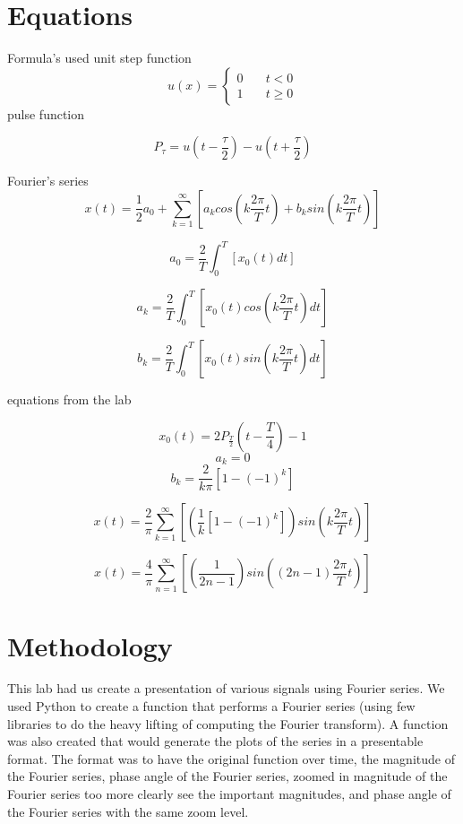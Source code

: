 \documentclass[12pt,a4paper]{article}
\begin{document}
\section{Equations}\label{sec:lit-rev}
Formula's used
unit step function
\[
u(x) = \left\{
        \begin{array}{ll}
            0 & \quad t < 0 \\
            1 & \quad t \geq 0
        \end{array}
    \right.
\]
pulse function

\[P_{\tau} = u \left (t-\frac \tau 2 \right)-u \left (t+\frac \tau 2 \right)\]

Fourier's series
\[x(t) = \frac 1  2 a_0 + \sum_{k=1}^\infty \left[ a_k cos \left (k \frac {2\pi}  T t \right) + b_k sin \left(k \frac {2\pi}  T t \right) \right]\]

\[a_0 = \frac 2 T \int_0^T \left [ x_0(t) dt \right ]\]

\[a_k = \frac 2 T \int_0^T \left [ x_0(t) cos \left (k \frac {2 \pi} T t \right )dt \right ]\]

\[b_k = \frac 2 T \int_0^T \left [ x_0(t) sin \left (k \frac {2 \pi} T t \right )dt \right ]\]


equations from the lab

\[x_0(t) = 2 P_{\frac T 2} \left (t-\frac T 4 \right)- 1\]
\[a_k =  0\]
\[b_k =   \frac 2  {k \pi}   \left [ 1-(-1)^k \right ] \]


\[x(t) = \frac 2  { \pi }  \sum _{k=1}^\infty \left[ \left (\frac 1  {k}   \left [1- (-1)^k \right ] \right) sin \left(k \frac {2 \pi}  {T} t \right) \right]\]

\[x(t) = \frac 4  { \pi }  \sum_{n=1}^\infty \left[ \left(\frac 1  {2n-1}    \right) sin \left((2n-1) \frac {2 \pi} {T} t \right) \right]\]


\section{Methodology}\label{sec:meth}
This lab had us create a presentation of various signals using Fourier series. We used Python to create a function that performs a Fourier series (using few libraries to do the heavy lifting of computing the Fourier transform). A function was also created that would generate the plots of the series in a presentable format. The format was to have the original function over time, the magnitude of the Fourier series, phase angle of the Fourier series, zoomed in magnitude of the Fourier series too more clearly see the important magnitudes, and phase angle of the Fourier series with the same zoom level.
\end{document}
